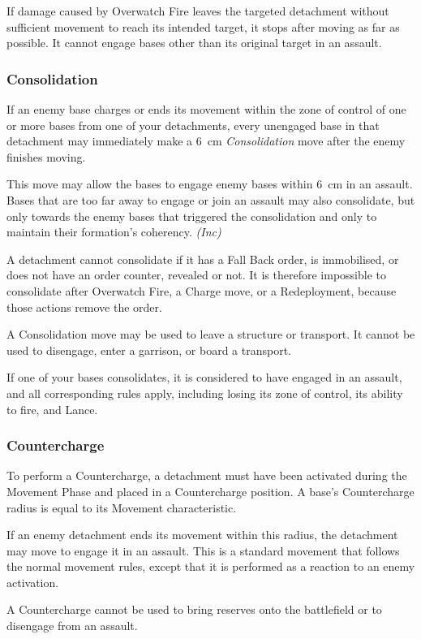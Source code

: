 If damage caused by Overwatch Fire leaves the targeted detachment without sufficient movement to reach its intended target, it stops after moving as far as possible. It cannot engage bases other than its original target in an assault.

\subsubsection{Consolidation}

If an enemy base charges or ends its movement within the zone of control of one or more bases from one of your detachments, every unengaged base in that detachment may immediately make a 6~cm \textit{Consolidation} move after the enemy finishes moving.

This move may allow the bases to engage enemy bases within 6~cm in an assault. Bases that are too far away to engage or join an assault may also consolidate, but only towards the enemy bases that triggered the consolidation and only to maintain their formation's coherency. \textit{(Inc)}

A detachment cannot consolidate if it has a Fall Back order, is immobilised, or does not have an order counter, revealed or not. It is therefore impossible to consolidate after Overwatch Fire, a Charge move, or a Redeployment, because those actions remove the order.

A Consolidation move may be used to leave a structure or transport. It cannot be used to disengage, enter a garrison, or board a transport.

If one of your bases consolidates, it is considered to have engaged in an assault, and all corresponding rules apply, including losing its zone of control, its ability to fire, and Lance.

\subsubsection{Countercharge}

To perform a Countercharge, a detachment must have been activated during the Movement Phase and placed in a Countercharge position. A base's Countercharge radius is equal to its Movement characteristic.

If an enemy detachment ends its movement within this radius, the detachment may move to engage it in an assault. This is a standard movement that follows the normal movement rules, except that it is performed as a reaction to an enemy activation.

A Countercharge cannot be used to bring reserves onto the battlefield or to disengage from an assault.
